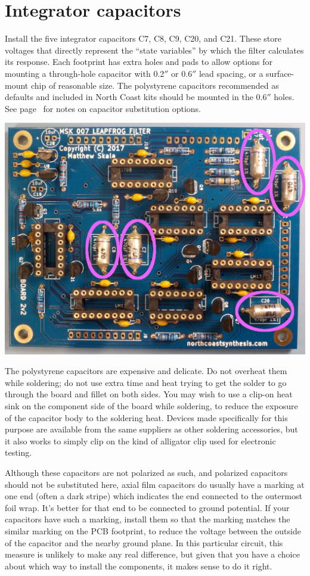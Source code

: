 \section{Integrator capacitors}

Install the five integrator capacitors C7, C8, C9, C20, and C21.  These
store voltages that directly represent the ``state variables'' by which the
filter calculates its response.  Each footprint has extra holes and pads to
allow options for mounting a through-hole capacitor with 0.2$''$ or 0.6$''$
lead spacing, or a surface-mount chip of reasonable size.  The polystyrene
capacitors recommended as defaults and included in North Coast kits should
be mounted in the 0.6$''$ holes.  See page~\pageref{pag:integrator-sub} for
notes on capacitor substitution options.

\nopagebreak
\noindent\includegraphics[width=\linewidth]{cap-470p.jpg}

\pagebreak

The polystyrene capacitors are expensive and delicate.  Do not overheat them
while soldering; do not use extra time and heat trying to get the solder to
go through the board and fillet on both sides.  You may wish to use a
clip-on heat sink on the component side of the board while soldering, to
reduce the exposure of the capacitor body to the soldering heat.  Devices
made specifically for this purpose are available from the same suppliers as
other soldering accessories, but it also works to simply clip on the kind of
alligator clip used for electronic testing.

Although these capacitors are not polarized as such, and polarized
capacitors should not be substituted here, axial film capacitors do usually
have a marking at one end (often a dark stripe) which indicates the end
connected to the outermost foil wrap.  It's better for that end to be
connected to ground potential.  If your capacitors have such a marking,
install them so that the marking matches the similar marking on the PCB
footprint, to reduce the voltage between the outside of the capacitor and
the nearby ground plane.  In this particular circuit, this measure is
unlikely to make any real difference, but given that you have a choice about
which way to install the components, it makes sense to do it right.

